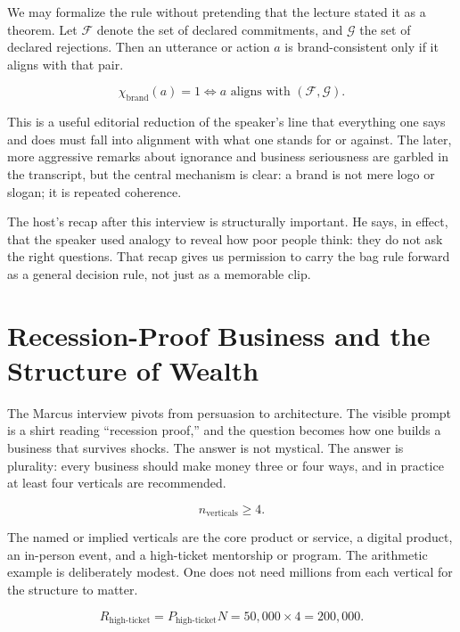 We may formalize the rule without pretending that the lecture stated it as a theorem. Let \(\mathcal{F}\) denote the set of declared commitments, and \(\mathcal{G}\) the set of declared rejections. Then an utterance or action \(a\) is brand-consistent only if it aligns with that pair.

\begin{equation}
\chi_{\text{brand}}(a)=1
\iff
a \text{ aligns with }(\mathcal{F},\mathcal{G}).
\end{equation}

This is a useful editorial reduction of the speaker's line that everything one says and does must fall into alignment with what one stands for or against. The later, more aggressive remarks about ignorance and business seriousness are garbled in the transcript, but the central mechanism is clear: a brand is not mere logo or slogan; it is repeated coherence.

The host's recap after this interview is structurally important. He says, in effect, that the speaker used analogy to reveal how poor people think: they do not ask the right questions. That recap gives us permission to carry the bag rule forward as a general decision rule, not just as a memorable clip.

\section{Recession-Proof Business and the Structure of Wealth}

The Marcus interview pivots from persuasion to architecture. The visible prompt is a shirt reading ``recession proof,'' and the question becomes how one builds a business that survives shocks. The answer is not mystical. The answer is plurality: every business should make money three or four ways, and in practice at least four verticals are recommended.

\begin{equation}
n_{\text{verticals}}\ge 4.
\end{equation}

The named or implied verticals are the core product or service, a digital product, an in-person event, and a high-ticket mentorship or program. The arithmetic example is deliberately modest. One does not need millions from each vertical for the structure to matter.

\begin{equation}
R_{\text{high-ticket}}
=
P_{\text{high-ticket}}N
=
50{,}000\times 4
=
200{,}000.
\end{equation}

